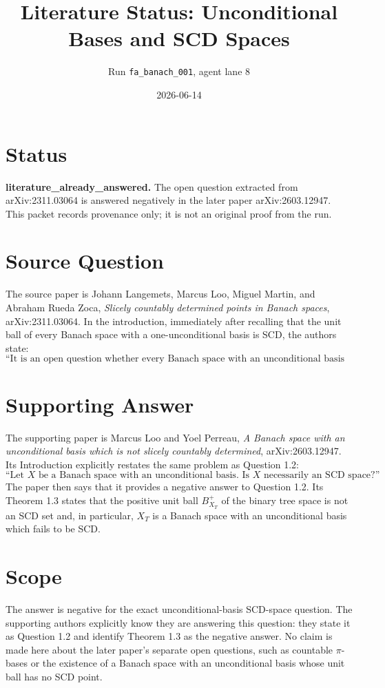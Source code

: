 \documentclass[11pt]{article}
\title{Literature Status: Unconditional Bases and SCD Spaces}
\author{Run \texttt{fa\_banach\_001}, agent lane 8}
\date{2026-06-14}
\begin{document}
\maketitle

\section*{Status}

\textbf{literature\_already\_answered.}  The open question extracted from
arXiv:2311.03064 is answered negatively in the later paper arXiv:2603.12947.
This packet records provenance only; it is not an original proof from the run.

\section*{Source Question}

The source paper is Johann Langemets, Marcus Loo, Miguel Martin, and Abraham
Rueda Zoca, \emph{Slicely countably determined points in Banach spaces},
arXiv:2311.03064.  In the introduction, immediately after recalling that the
unit ball of every Banach space with a one-unconditional basis is SCD, the
authors state:
\[
\text{``It is an open question whether every Banach space with an
unconditional basis is an SCD space.''}
\]

\section*{Supporting Answer}

The supporting paper is Marcus Loo and Yoel Perreau, \emph{A Banach space with
an unconditional basis which is not slicely countably determined},
arXiv:2603.12947.  Its Introduction explicitly restates the same problem as
Question 1.2:
\[
\text{``Let }X\text{ be a Banach space with an unconditional basis. Is }X
\text{ necessarily an SCD space?''}
\]
The paper then says that it provides a negative answer to Question 1.2.  Its
Theorem 1.3 states that the positive unit ball \(B_{X_T}^+\) of the binary
tree space is not an SCD set and, in particular, \(X_T\) is a Banach space
with an unconditional basis which fails to be SCD.

\section*{Scope}

The answer is negative for the exact unconditional-basis SCD-space question.
The supporting authors explicitly know they are answering this question: they
state it as Question 1.2 and identify Theorem 1.3 as the negative answer.  No
claim is made here about the later paper's separate open questions, such as
countable \(\pi\)-bases or the existence of a Banach space with an
unconditional basis whose unit ball has no SCD point.
\end{document}

